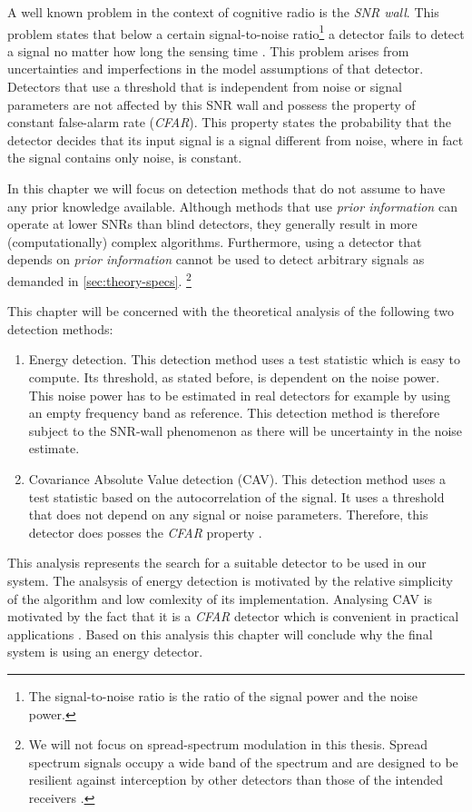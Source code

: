 \documentclass[a4paper, openany, oneside]{memoir}
\begin{document}
A well known problem in the context of cognitive radio is the \emph{SNR wall}. This problem states that below a certain signal-to-noise ratio\footnote{The signal-to-noise ratio is the ratio of the signal power and the noise power.} a detector fails to detect a signal no matter how long the sensing time \cite{sahai2009spectrum}. This problem arises from uncertainties and imperfections in the model assumptions of that detector. Detectors that use a threshold that is independent from noise or signal parameters are not affected by this SNR wall \cite{axell2012spectrum} and possess the property of constant false-alarm rate (\emph{CFAR}). This property states the probability that the detector decides that its input signal is a signal different from noise, where in fact the signal contains only noise, is constant. 

In this chapter we will focus on detection methods that do not assume to have any prior knowledge available. Although methods that use \emph{prior information} can operate at lower SNRs than blind detectors, they generally result in more (computationally) complex algorithms. Furthermore, using a detector that depends on \emph{prior information} cannot be used to detect arbitrary signals as demanded in \cref{sec:theory-specs}. \footnote{We will not focus on spread-spectrum modulation in this thesis. Spread spectrum signals occupy a wide band of the spectrum and are designed to be resilient against interception by other detectors than those of the intended receivers \cite{pickholtz1982theory,gevargiz1989adaptive}.}

This chapter will be concerned with the theoretical analysis of the following two detection methods:

\begin{enumerate}
	\item Energy detection. This detection method uses a test statistic which is easy to compute. Its threshold, as stated before, is dependent on 
	the noise power. This noise power has to be estimated in real detectors for example by using an empty frequency band as reference. This detection method is therefore subject to the SNR-wall phenomenon as there will be uncertainty in the noise estimate.
	\item Covariance Absolute Value detection (CAV). This detection method uses a test statistic based on the autocorrelation of 
	the signal. It uses a threshold that does not depend on any signal or noise parameters. Therefore, this detector does posses the \emph{CFAR} property \cite{sharma2011sensors}.
\end{enumerate}

This analysis represents the search for a suitable detector to be used in our system.  The analsysis of energy detection is motivated by the relative simplicity of the algorithm and low comlexity of its implementation. Analysing CAV is motivated by the fact that it is a \emph{CFAR} detector which is convenient in practical applications \cite{axell2012spectrum}.  Based on this analysis this chapter will conclude why the final system is using an energy detector. 
\end{document}

